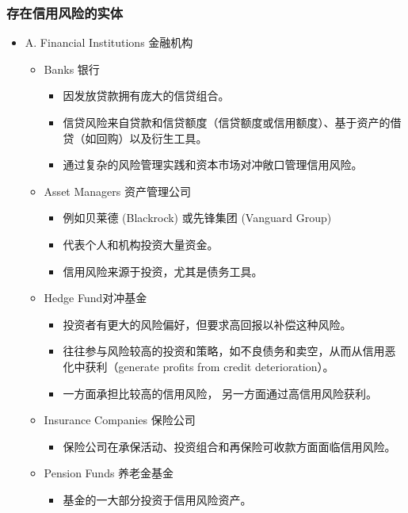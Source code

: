 \subsubsection{存在信用风险的实体}
\begin{itemize}
\item A. Financial Institutions 金融机构
    \begin{itemize}
    \item Banks 银行
        \begin{itemize}
        \item 因发放贷款拥有庞大的信贷组合。
        \item 信贷风险来自贷款和信贷额度（信贷额度或信用额度）、基于资产的借贷（如回购）以及衍生工具。
        \item 通过复杂的风险管理实践和资本市场对冲敞口管理信用风险。
        \end{itemize}
    \item Asset Managers 资产管理公司
        \begin{itemize}
        \item 例如贝莱德 (Blackrock) 或先锋集团 (Vanguard Group) 
        \item 代表个人和机构投资大量资金。
        \item 信用风险来源于投资，尤其是债务工具。
        \end{itemize}
    \item  Hedge Fund对冲基金
        \begin{itemize}
        \item 投资者有更大的风险偏好，但要求高回报以补偿这种风险。
        \item 往往参与风险较高的投资和策略，如不良债务和卖空，从而从信用恶化中获利（generate profits from credit deterioration）。
        \item 一方面承担比较高的信用风险， 另一方面通过高信用风险获利。
        \end{itemize}
    \item Insurance Companies 保险公司
        \begin{itemize}
        \item 保险公司在承保活动、投资组合和再保险可收款方面面临信用风险。
        \end{itemize}
    \item Pension Funds 养老金基金
        \begin{itemize}
        \item 基金的一大部分投资于信用风险资产。
        \end{itemize}
    \end{itemize}


\end{itemize}
